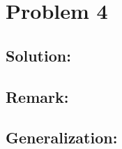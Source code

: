 \section*{Problem 4}

\vspace{4mm}

\subsection*{Solution:}


\subsection*{Remark:}


\subsection*{Generalization:}




